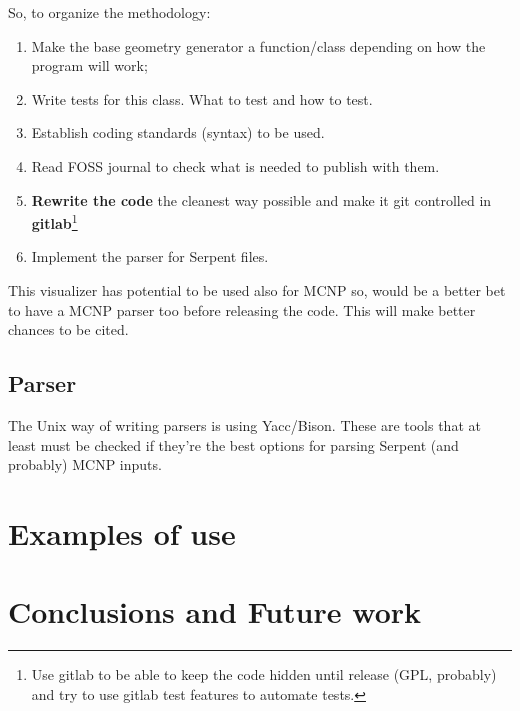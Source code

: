 \documentclass{elsarticle}
\begin{document}
So, to organize the methodology:
\begin{enumerate}

\item Make the base geometry generator a function/class depending on how the program will work;
\item Write tests for this class. What to test and how to test.
\item Establish coding standards (syntax) to be used.
\item Read FOSS journal to check what is needed to publish with them.
\item \textbf{Rewrite the code} the cleanest way possible and make it git controlled in \textbf{gitlab}\footnote{Use gitlab to be able to keep the code hidden until release (GPL, probably) and try to use gitlab test features to automate tests.}
\item Implement the parser for Serpent files.
\end{enumerate}

This visualizer has potential to be used also for MCNP so, would be a better bet to have a MCNP parser too before releasing the code. This will
make better chances to be cited.

\subsection{Parser}

The Unix way of writing parsers is using Yacc/Bison. These are tools that at least must be checked if they're the
best options for parsing Serpent (and probably) MCNP inputs.


\section{Examples of use}

\section{Conclusions and Future work}



\end{document}
